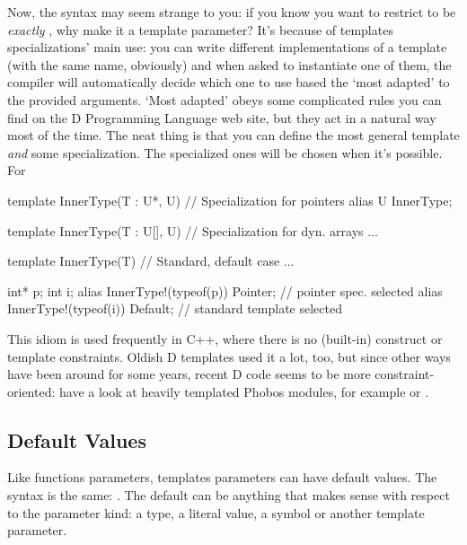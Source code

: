 Now, the  syntax may seem strange to you: if you know you want to restrict  to be \emph{exactly} , why make it a template parameter? It's because of templates specializations' main use: you can write different implementations of a template (with the same name, obviously) and when asked to instantiate one of them, the compiler will automatically decide which one to use based the `most adapted' to the provided arguments. `Most adapted' obeys some complicated rules you can find on the D Programming Language web site, but they act in a natural way most of the time. The neat thing is that you can define the most general template \emph{and} some specialization. The specialized ones will be chosen when it's possible. For 

\begin{dcode}
template InnerType(T : U*, U) // Specialization for pointers
{
    alias U InnerType;
}

template InnerType(T : U[], U) // Specialization for dyn. arrays
{ ... }

template InnerType(T) // Standard, default case
{ ... }

int* p;
int i; 
alias InnerType!(typeof(p)) Pointer; // pointer spec. selected
alias InnerType!(typeof(i)) Default; // standard template selected
\end{dcode}

This idiom is used frequently in C++, where there is no (built-in)  construct or template constraints. Oldish D templates used it a lot, too, but since other ways have been around for some years, recent D code seems to be more constraint-oriented: have a look at heavily templated Phobos modules, for example  or .


\subsection{Default Values}\label{default}

Like functions parameters, templates parameters can have default values. The syntax is the same: . The default can be anything that makes sense with respect to the parameter kind: a type, a literal value, a symbol or another template parameter.

